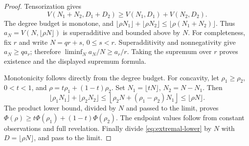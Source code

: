 \begin{proof}
Tensorization gives
\[
 V(N_1+N_2,D_1+D_2)\ge V(N_1,D_1)+V(N_2,D_2).
\]
The degree budget is monotone, and
\(\lfloor\rho N_1\rfloor+\lfloor\rho N_2\rfloor
\le\lfloor\rho(N_1+N_2)\rfloor\).
Thus \(a_N=V(N,\lfloor\rho N\rfloor)\) is superadditive and
bounded above by \(N\). For completeness, fix \(r\) and write
\(N=qr+s\), \(0\le s<r\). Superadditivity and nonnegativity give
\(a_N\ge q a_r\); therefore
\(\liminf_Na_N/N\ge a_r/r\). Taking the supremum over \(r\)
proves existence and the displayed supremum formula.

Monotonicity follows directly from the degree budget. For concavity,
let \(\rho_1\ge\rho_2\), \(0<t<1\), and
\(\rho=t\rho_1+(1-t)\rho_2\).
Set \(N_1=\lfloor tN\rfloor\), \(N_2=N-N_1\). Then
\[
 \lfloor\rho_1N_1\rfloor+\lfloor\rho_2N_2\rfloor
 \le\left\lfloor\rho_2N+(\rho_1-\rho_2)N_1\right\rfloor
 \le\lfloor\rho N\rfloor.
\]
The product lower bound, divided by \(N\) and passed to the limit,
proves
\(\Phi(\rho)\ge t\Phi(\rho_1)+(1-t)\Phi(\rho_2)\).
The endpoint values follow from constant observations and full
revelation. Finally divide \eqref{eq:extremal-lower} by \(N\)
with \(D=\lfloor\rho N\rfloor\), and pass to the limit.
\end{proof}
